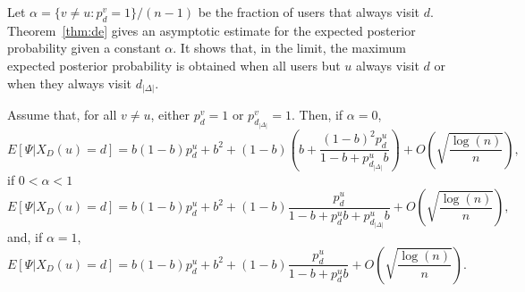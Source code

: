 \documentclass[prodmode,acmtissec]{acmsmall}
\begin{document}
Let $\alpha = \{v\neq u : p^v_d = 1 \}/(n-1)$ be the fraction of users that always visit $d$.  Theorem~\ref{thm:de} gives an asymptotic estimate for the expected posterior probability given a constant $\alpha$.  It shows that, in the limit, the maximum expected posterior probability is obtained when all users but $u$ always visit $d$ or when they always visit $d_{|\Delta|}$.
\begin{theorem} \label{thm:de}
Assume that, for all $v\neq u$, either  $p^v_d=1$ or $p^v_{d_{|\Delta|}}=1$.  Then, if $\alpha = 0$,
\begin{equation*}
E[\Psi | X_D(u)=d] = b(1-b)p^u_d + b^2 + (1-b) \left( b+\frac{(1-b)^2 p^u_d }{1 - b + p^u_{d_{|\Delta|}} b} \right) + O\left(\sqrt{\frac{\log(n)}{n}} \right),
\end{equation*}
if $0<\alpha<1$
\begin{equation*}
E[\Psi | X_D(u)=d] = b(1-b)p^u_d + b^2 + (1-b) \frac{p^u_d }{1-b + p^u_d b + p^u_{d_{|\Delta|}}b} + O\left(\sqrt{\frac{\log(n)}{n}} \right),
\end{equation*}
and, if $\alpha=1$,
\begin{equation*}
E[\Psi | X_D(u)=d] = b(1-b)p^u_d + b^2 + (1-b) \frac{p^u_d}{1-b + p^u_d b} + O\left(\sqrt{\frac{\log(n)}{n}} \right).
\end{equation*}
\end{theorem}
\end{document}
